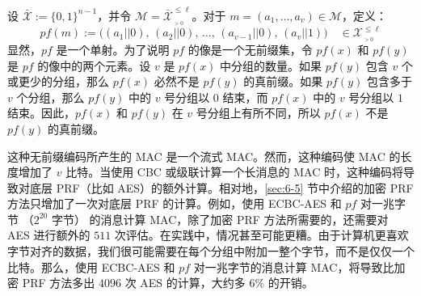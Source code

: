 \begin{snote}[方法 2：停止比特。]
设 $\mathcal{\bar{X}}:=\{0,1\}^{n-1}$，并令 $\mathcal{M}=\mathcal{\bar{X}}^{\leq\ell}_{_{>0}}$。对于 $m=(a_1,\dots,a_v)\in\mathcal{M}$，定义：
\[
pf(m):=\big((a_1||0),\,(a_2||0),\,\dots,\,(a_{v-1}||0),\,(a_v||1)\big)\quad\in\mathcal{X}^{\leq\ell}_{_{>0}}
\]
显然，$pf$ 是一个单射。为了说明 $pf$ 的像是一个无前缀集，令 $pf(x)$ 和 $pf(y)$ 是 $pf$ 的像中的两个元素。设 $v$ 是 $pf(x)$ 中分组的数量。如果 $pf(y)$ 包含 $v$ 个或更少的分组，那么 $pf(x)$ 必然不是 $pf(y)$ 的真前缀。如果 $pf(y)$ 包含多于 $v$ 个分组，那么 $pf(y)$ 中的 $v$ 号分组以 $0$ 结束，而 $pf(x)$ 中的 $v$ 号分组以 $1$ 结束。因此，$pf(x)$ 和 $pf(y)$ 在 $v$ 号分组上有所不同，所以 $pf(x)$ 不是 $pf(y)$ 的真前缀。

这种无前缀编码所产生的 MAC 是一个流式 MAC。然而，这种编码使 MAC 的长度增加了 $v$ 比特。当使用 CBC 或级联计算一个长消息的 MAC 时，这种编码将导致对底层 PRF（比如 AES）的额外计算。相对地，\ref{sec:6-5} 节中介绍的加密 PRF 方法只增加了一次对底层 PRF 的计算。例如，使用 ECBC-AES 和 $pf$ 对一兆字节 （$2^{20}$ 字节） 的消息计算 MAC，除了加密 PRF 方法所需要的，还需要对 AES 进行额外的 $511$ 次评估。在实践中，情况甚至可能更糟。由于计算机更喜欢字节对齐的数据，我们很可能需要在每个分组中附加一整个字节，而不是仅仅一个比特。那么，使用 ECBC-AES 和 $pf$ 对一兆字节的消息计算 MAC，将导致比加密 PRF 方法多出 $4096$ 次 AES 的计算，大约多 $6\%$ 的开销。
\end{snote}